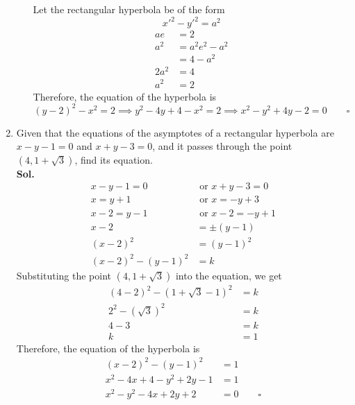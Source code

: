 \documentclass{report}
\newcommand{\sol}{\vspace{1em}\\\textbf{Sol.}}
\newcommand{\eos}{ \qquad \square}
\begin{document}
\begin{enumerate}[leftmargin=*]
\begin{enumerate}[label=(\alph*)]
                    Let the rectangular hyperbola be of the form
                    \begin{equation*}
                        x'^2 - y'^2 = a^2
                    \end{equation*}
                    \begin{align*}
                        ae   & = 2            \\
                        a^2  & = a^2e^2 - a^2 \\
                             & = 4 - a^2      \\
                        2a^2 & = 4            \\
                        a^2  & = 2
                    \end{align*}
                    Therefore, the equation of the hyperbola is
                    \begin{equation*}
                        (y-2)^2 - x^2 = 2 \implies y^2 - 4y + 4 - x^2 = 2 \implies x^2 - y^2 + 4y - 2 = 0 \eos
                    \end{equation*}
          \end{enumerate}

    \item Given that the equations of the asymptotes of a rectangular hyperbola are
          $x-y-1=0$ and $x+y-3=0$, and it passes through the point $(4,1+\sqrt{3})$, find
          its equation. \sol{}
          \begin{align*}
              x - y - 1 = 0     & \text{ or } x + y - 3 = 0  \\
              x = y + 1         & \text{ or } x = -y + 3     \\
              x - 2 = y - 1     & \text{ or } x - 2 = -y + 1 \\
              x - 2             & = \pm(y - 1)               \\
              (x-2)^2           & = (y-1)^2                  \\
              (x-2)^2 - (y-1)^2 & = k
          \end{align*}
          Substituting the point $(4,1+\sqrt{3})$ into the equation, we get
          \begin{align*}
              (4-2)^2 - (1+\sqrt{3}-1)^2 & = k \\
              2^2 - (\sqrt{3})^2         & = k \\
              4 - 3                      & = k \\
              k                          & = 1
          \end{align*}
          Therefore, the equation of the hyperbola is
          \begin{align*}
              (x-2)^2 - (y-1)^2           & = 1      \\
              x^2 - 4x + 4 - y^2 + 2y - 1 & = 1      \\
              x^2 - y^2 - 4x + 2y + 2     & = 0 \eos
          \end{align*}


\end{enumerate}
\end{document}
